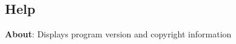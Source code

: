 
\subsection{Help}

\textbf{About}: Displays program version and copyright information

\begin{comment}
\section{Toolbar}

The toolbar contains buttons and controls for the most frequently used actions.

\begin{figure}[h]
\centering
\texttt{[image: images/toolbar.png]}
\caption{ngscopeclient toolbar}
\label{toolbar}
\end{figure}

\subsection{Capture buttons}

The capture button group (Fig. \ref{capturebuttons}) contains three buttons. From left to right these are ``arm
normal trigger", ``arm one-shot trigger" and ``stop trigger".

Note that the ``normal" trigger mode still uses one-shot capture internally so that all waveform data can be downloaded
before the next trigger event.

\begin{figure}[h]
\centering
\texttt{[image: images/capture-icons.png]}
\caption{Capture control buttons}
\label{capturebuttons}
\end{figure}

\subsection{History}

The history button (Fig. \ref{historybutton}) toggles display of the \hyperref[sec:history]{waveform history view}.

\begin{figure}[h]
\centering
\texttt{[image: images/history-button.png]}
\caption{History button}
\label{historybutton}
\end{figure}


\end{comment}

